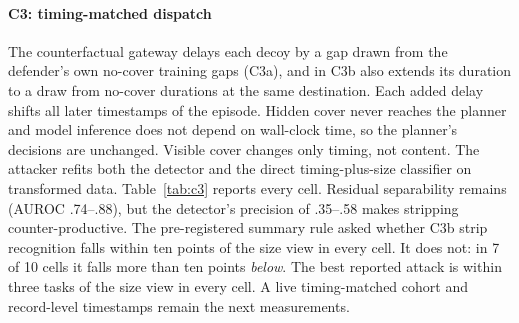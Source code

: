\paragraph{C3: timing-matched dispatch}
The counterfactual gateway delays each decoy by a gap drawn from the defender's own no-cover training gaps (C3a), and in C3b also extends its duration to a draw from no-cover durations at the same destination. Each added delay shifts all later timestamps of the episode. Hidden cover never reaches the planner and model inference does not depend on wall-clock time, so the planner's decisions are unchanged. Visible cover changes only timing, not content. The attacker refits both the detector and the direct timing-plus-size classifier on transformed data. Table~\ref{tab:c3} reports every cell. Residual separability remains (AUROC .74--.88), but the detector's precision of .35--.58 makes stripping counter-productive. The pre-registered summary rule asked whether C3b strip recognition falls within ten points of the size view in every cell. It does not: in 7 of 10 cells it falls more than ten points \emph{below}. The best reported attack is within three tasks of the size view in every cell. A live timing-matched cohort and record-level timestamps remain the next measurements.




